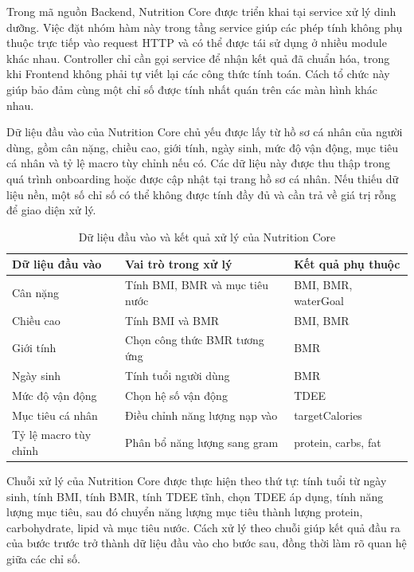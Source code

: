 Trong mã nguồn Backend, Nutrition Core được triển khai tại service xử lý dinh dưỡng. Việc đặt nhóm hàm này trong tầng service giúp các phép tính không phụ thuộc trực tiếp vào request HTTP và có thể được tái sử dụng ở nhiều module khác nhau. Controller chỉ cần gọi service để nhận kết quả đã chuẩn hóa, trong khi Frontend không phải tự viết lại các công thức tính toán. Cách tổ chức này giúp bảo đảm cùng một chỉ số được tính nhất quán trên các màn hình khác nhau.

Dữ liệu đầu vào của Nutrition Core chủ yếu được lấy từ hồ sơ cá nhân của người dùng, gồm cân nặng, chiều cao, giới tính, ngày sinh, mức độ vận động, mục tiêu cá nhân và tỷ lệ macro tùy chỉnh nếu có. Các dữ liệu này được thu thập trong quá trình onboarding hoặc được cập nhật tại trang hồ sơ cá nhân. Nếu thiếu dữ liệu nền, một số chỉ số có thể không được tính đầy đủ và cần trả về giá trị rỗng để giao diện xử lý.

\begin{table}[H]
\centering
\caption{Dữ liệu đầu vào và kết quả xử lý của Nutrition Core}
\begin{tabular}{|p{4cm}|p{5.5cm}|p{5.5cm}|}
\hline
\textbf{Dữ liệu đầu vào} & \textbf{Vai trò trong xử lý} & \textbf{Kết quả phụ thuộc} \\ \hline
Cân nặng & Tính BMI, BMR và mục tiêu nước & BMI, BMR, waterGoal \\ \hline
Chiều cao & Tính BMI và BMR & BMI, BMR \\ \hline
Giới tính & Chọn công thức BMR tương ứng & BMR \\ \hline
Ngày sinh & Tính tuổi người dùng & BMR \\ \hline
Mức độ vận động & Chọn hệ số vận động & TDEE \\ \hline
Mục tiêu cá nhân & Điều chỉnh năng lượng nạp vào & targetCalories \\ \hline
Tỷ lệ macro tùy chỉnh & Phân bổ năng lượng sang gram & protein, carbs, fat \\ \hline
\end{tabular}
\end{table}

Chuỗi xử lý của Nutrition Core được thực hiện theo thứ tự: tính tuổi từ ngày sinh, tính BMI, tính BMR, tính TDEE tĩnh, chọn TDEE áp dụng, tính năng lượng mục tiêu, sau đó chuyển năng lượng mục tiêu thành lượng protein, carbohydrate, lipid và mục tiêu nước. Cách xử lý theo chuỗi giúp kết quả đầu ra của bước trước trở thành dữ liệu đầu vào cho bước sau, đồng thời làm rõ quan hệ giữa các chỉ số.

